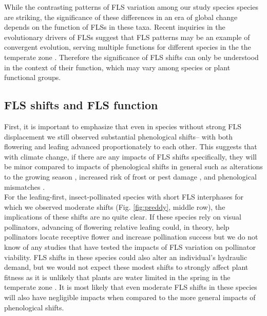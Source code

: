 \documentclass[11pt]{article}
\begin{document}
\noindent While the contrasting patterns of FLS variation among our study species species are striking, the significance of these differences in an era of global change depends on the function of FLSs in these taxa. Recent inquiries in the evolutionary drivers of FLSs suggest that FLS patterns may be an example of convergent evolution, serving multiple functions for different species in the the temperate zone \citep{Buonaiuto2020, Gougherty2018}. Therefore the significance of FLS shifts can only be understood in the context of their function, which may vary among species or plant functional groups.

\subsection*{FLS shifts and FLS function}
\noindent First, it is important to emphasize that even in species without strong FLS displacement we still observed substantial phenological shifts-- with both flowering and leafing advanced proportionately to each other. This suggests that with climate change, if there are any impacts of FLS shifts specifically, they will be minor compared to impacts of phenological shifts in general such as alterations to the growing season \citep{}, increased risk of frost or pest damage \citep{Liu:2018aa}, and phenological mismatches \citep{Memmott2007}. \\

\noindent For the leafing-first, insect-pollinated species with short FLS interphases for which we observed moderate shifts (Fig. \ref{fig:preddy}, middle row), the implications of these shifts are no quite clear. If these species rely on visual pollinators, advancing of flowering relative leafing could, in theory, help pollinators locate receptive flower and increase pollination success but we do not know of any studies that have tested the impacts of FLS variation on pollinator viability. FLS shifts in these species could also alter an individual's hydraulic demand, but we would not expect these modest shifts to strongly affect plant fitness as it is unlikely that plants are water limited in the spring in the temperate zone \citep{Polgar2011}. It is most likely that even moderate FLS shifts in these species will also have negligible impacts when compared to the more general impacts of phenological shifts. \\
\end{document}
